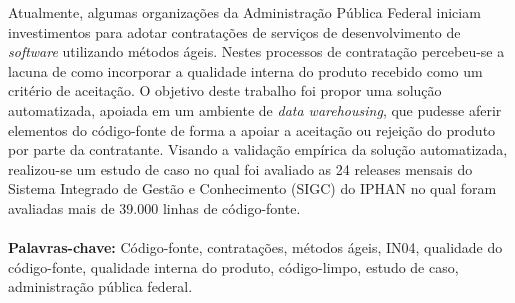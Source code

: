 \begin{resumo}

Atualmente, algumas organizações da Administração Pública Federal iniciam investimentos para adotar contratações de serviços de desenvolvimento de \textit{software} utilizando métodos ágeis. Nestes processos de contratação percebeu-se a lacuna de como incorporar a qualidade interna do produto recebido como um critério de aceitação. O objetivo deste trabalho foi propor uma solução automatizada, apoiada em um ambiente de \textit{data warehousing}, que pudesse aferir elementos do código-fonte de forma a apoiar a aceitação ou rejeição do produto por parte da contratante. Visando a validação empírica da solução automatizada, realizou-se um estudo de caso no qual foi avaliado as 24 releases mensais do Sistema Integrado de Gestão e Conhecimento (SIGC) do IPHAN no qual foram avaliadas mais de 39.000 linhas de código-fonte. 
{
\\
\\
\textbf{Palavras-chave:} Código-fonte, contratações, métodos ágeis, IN04, qualidade do código-fonte, qualidade interna do produto, código-limpo, estudo de caso, administração pública federal.}
\end{resumo}

